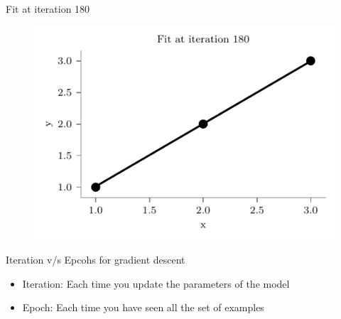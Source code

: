 \documentclass{beamer}
\begin{document}
\begin{frame}{Fit at iteration 180}
\begin{figure}
	\centering
	\includegraphics[width=0.7\linewidth]{gradient-descent/fit-iteration-180.pdf}
\end{figure}
\end{frame}

%		
%		
%		

	

	\begin{frame}{Iteration v/s Epcohs for gradient descent}
	\begin{itemize}[<+->]
		\item Iteration: Each time you update the parameters of the model
		\item Epoch: Each time you have seen all the set of examples
	\end{itemize}
\end{frame}
	
	

	
\end{document}
